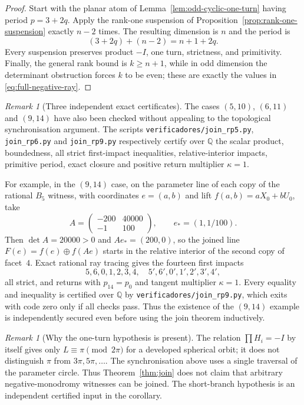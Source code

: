 \documentclass[11pt,a4paper]{article}
\theoremstyle{plain}
\theoremstyle{definition}
\theoremstyle{remark}
\newtheorem{remark}[theorem]{Remark}
\begin{document}
\begin{proof}
Start with the planar atom of Lemma~\ref{lem:odd-cyclic-one-turn} having period
$p=3+2q$.  Apply the rank-one suspension of
Proposition~\ref{prop:rank-one-suspension} exactly $n-2$ times.  The resulting
dimension is $n$ and the period is
\[
                    (3+2q)+(n-2)=n+1+2q.
\]
Every suspension preserves product $-I$, one turn, strictness, and primitivity.
Finally, the general rank bound is $k\ge n+1$, while in odd dimension the
determinant obstruction forces $k$ to be even; these are exactly the values in
\eqref{eq:full-negative-ray}.
\end{proof}



\begin{remark}[Three independent exact certificates]
The cases $(5,10)$, $(6,11)$ and $(9,14)$ have also been checked without appealing
to the topological synchronisation argument.  The scripts
\texttt{verificadores/join\_rp5.py}, \texttt{join\_rp6.py} and
\texttt{join\_rp9.py} respectively certify over $\mathbb Q$ the scalar product,
boundedness, all strict first-impact inequalities, relative-interior impacts,
primitive period, exact closure and positive return multiplier $\kappa=1$.

For example, in the $(9,14)$ case, on the parameter line of each copy of the
rational $B_5$ witness, with coordinates $e=(a,b)$ and lift
$f(a,b)=aX_0+bU_0$, take
\[
 A=\begin{pmatrix}-200&40000\\-1&100\end{pmatrix},
 \qquad e_*=(1,1/100).
\]
Then $\det A=20000>0$ and $Ae_*=(200,0)$, so the joined line
$F(e)=f(e)\oplus f(Ae)$ starts in the relative interior of the second copy of
facet~$4$.  Exact rational ray tracing gives the fourteen first impacts
\[
5,6,0,1,2,3,4,\quad 5',6',0',1',2',3',4',
\]
all strict, and returns with $p_{14}=p_0$ and tangent multiplier $\kappa=1$.
Every equality and inequality is certified over $\mathbb Q$ by
\texttt{verificadores/join\_rp9.py}, which exits with code zero only if all checks
pass.  Thus the existence of the $(9,14)$ example is independently secured even
before using the join theorem inductively.
\end{remark}

\begin{remark}[Why the one-turn hypothesis is present]
The relation $\prod H_i=-I$ by itself gives only
$L\equiv\pi\pmod{2\pi}$ for a developed spherical orbit; it does not distinguish
$\pi$ from $3\pi,5\pi,\ldots$.  The synchronisation above uses a single traversal
of the parameter circle.  Thus Theorem~\ref{thm:join} does not claim that arbitrary
negative-monodromy witnesses can be joined.  The short-branch hypothesis is an
independent certified input in the corollary.
\end{remark}
\end{document}
